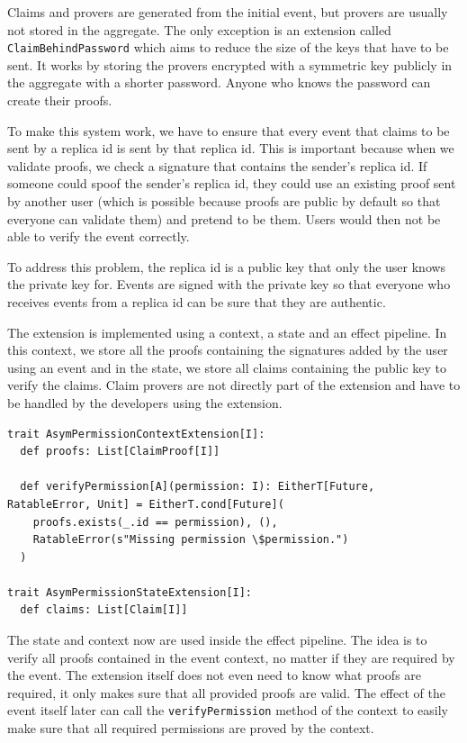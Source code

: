 \documentclass[
	english,
	ruledheaders=section,   %
	class=report,		    %
	thesis={type=bachelor}, %
	accentcolor=9c,			%
	custommargins=true,    %
	marginpar=false,        %
	parskip=half-,          %
	fontsize=11pt,          %
]{tudapub}
\begin{document}
Claims and provers are generated from the initial event, but provers are usually not stored in the aggregate. The only exception is an extension called \texttt{ClaimBehindPassword} which aims to reduce the size of the keys that have to be sent. It works by storing the provers encrypted with a symmetric key publicly in the aggregate with a shorter password. Anyone who knows the password can create their proofs.

To make this system work, we have to ensure that every event that claims to be sent by a replica id is sent by that replica id. This is important because when we validate proofs, we check a signature that contains the sender's replica id. If someone could spoof the sender's replica id, they could use an existing proof sent by another user (which is possible because proofs are public by default so that everyone can validate them) and pretend to be them. Users would then not be able to verify the event correctly.

To address this problem, the replica id is a public key that only the user knows the private key for. Events are signed with the private key so that everyone who receives events from a replica id can be sure that they are authentic.

The extension is implemented using a context, a state and an effect pipeline. In this context, we store all the proofs containing the signatures added by the user using an event and in the state, we store all claims containing the public key to verify the claims. Claim provers are not directly part of the extension and have to be handled by the developers using the extension.

\begin{lstlisting}
trait AsymPermissionContextExtension[I]:
  def proofs: List[ClaimProof[I]]

  def verifyPermission[A](permission: I): EitherT[Future, RatableError, Unit] = EitherT.cond[Future](
    proofs.exists(_.id == permission), (),
    RatableError(s"Missing permission \$permission.")
  )

trait AsymPermissionStateExtension[I]:
  def claims: List[Claim[I]]
\end{lstlisting}

The state and context now are used inside the effect pipeline. The idea is to verify all proofs contained in the event context, no matter if they are required by the event. The extension itself does not even need to know what proofs are required, it only makes sure that all provided proofs are valid. The effect of the event itself later can call the \texttt{verifyPermission} method of the context to easily make sure that all required permissions are proved by the context.
\end{document}
